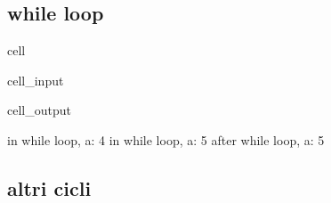 \documentclass[letterpaper,10pt,english]{jupyterBook}
\begin{document}
\subsection{while loop}
\label{\detokenize{ch/programming/flow_control:while-loop}}
\begin{sphinxuseclass}{cell}\begin{sphinxVerbatimInput}

\begin{sphinxuseclass}{cell_input}
\begin{sphinxVerbatim}[commandchars=\\\{\}]

  

     
      

\end{sphinxVerbatim}

\end{sphinxuseclass}\end{sphinxVerbatimInput}
\begin{sphinxVerbatimOutput}

\begin{sphinxuseclass}{cell_output}
\begin{sphinxVerbatim}[commandchars=\\\{\}]
\PYGZgt{}\PYGZgt{} in while loop, a: 4
\PYGZgt{}\PYGZgt{} in while loop, a: 5
after while loop, a: 5
\end{sphinxVerbatim}

\end{sphinxuseclass}\end{sphinxVerbatimOutput}

\end{sphinxuseclass}

\subsection{altri cicli}
\label{\detokenize{ch/programming/flow_control:altri-cicli}}
\sphinxAtStartPar
{}
\end{document}
